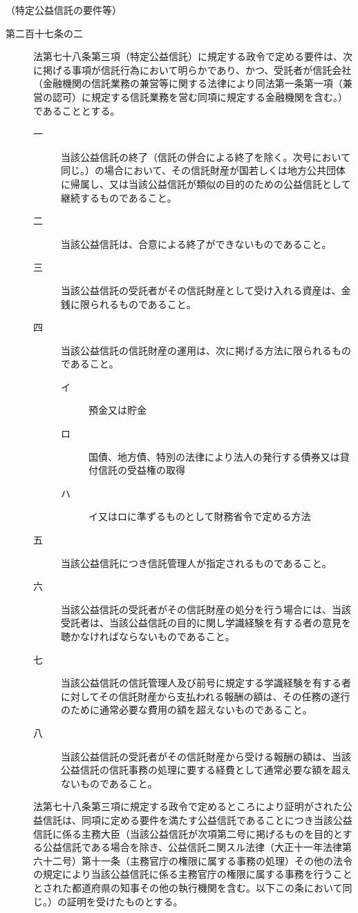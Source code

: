 \documentclass[twocolumn,a4j,10pt]{ltjtarticle}
\begin{document}
\noindent\hspace{10pt}（特定公益信託の要件等）
\begin{description}
\item[第二百十七条の二]法第七十八条第三項（特定公益信託）に規定する政令で定める要件は、次に掲げる事項が信託行為において明らかであり、かつ、受託者が信託会社（金融機関の信託業務の兼営等に関する法律により同法第一条第一項（兼営の認可）に規定する信託業務を営む同項に規定する金融機関を含む。）であることとする。
\begin{description}
\item[一]当該公益信託の終了（信託の併合による終了を除く。次号において同じ。）の場合において、その信託財産が国若しくは地方公共団体に帰属し、又は当該公益信託が類似の目的のための公益信託として継続するものであること。
\item[二]当該公益信託は、合意による終了ができないものであること。
\item[三]当該公益信託の受託者がその信託財産として受け入れる資産は、金銭に限られるものであること。
\item[四]当該公益信託の信託財産の運用は、次に掲げる方法に限られるものであること。
\begin{description}
\item[イ]預金又は貯金
\item[ロ]国債、地方債、特別の法律により法人の発行する債券又は貸付信託の受益権の取得
\item[ハ]イ又はロに準ずるものとして財務省令で定める方法
\end{description}
\item[五]当該公益信託につき信託管理人が指定されるものであること。
\item[六]当該公益信託の受託者がその信託財産の処分を行う場合には、当該受託者は、当該公益信託の目的に関し学識経験を有する者の意見を聴かなければならないものであること。
\item[七]当該公益信託の信託管理人及び前号に規定する学識経験を有する者に対してその信託財産から支払われる報酬の額は、その任務の遂行のために通常必要な費用の額を超えないものであること。
\item[八]当該公益信託の受託者がその信託財産から受ける報酬の額は、当該公益信託の信託事務の処理に要する経費として通常必要な額を超えないものであること。
\end{description}
\item[]法第七十八条第三項に規定する政令で定めるところにより証明がされた公益信託は、同項に定める要件を満たす公益信託であることにつき当該公益信託に係る主務大臣（当該公益信託が次項第二号に掲げるものを目的とする公益信託である場合を除き、公益信託ニ関スル法律（大正十一年法律第六十二号）第十一条（主務官庁の権限に属する事務の処理）その他の法令の規定により当該公益信託に係る主務官庁の権限に属する事務を行うこととされた都道府県の知事その他の執行機関を含む。以下この条において同じ。）の証明を受けたものとする。

\end{description}
\end{document}
